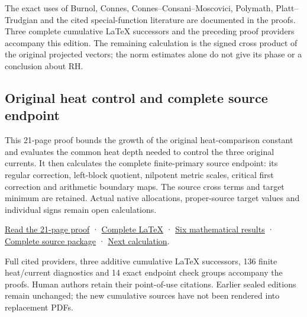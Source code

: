 \documentclass[
]{article}
\begin{document}
The exact uses of Burnol, Connes, Connes--Consani--Moscovici, Polymath,
Platt--Trudgian and the cited special-function literature are documented
in the proofs. Three complete cumulative LaTeX successors and the
preceding proof providers accompany this edition. The remaining
calculation is the signed cross product of the original projected
vectors; the norm estimates alone do not give its phase or a conclusion
about RH.

\subsection{Original heat control and complete source
endpoint}\label{original-heat-control-and-complete-source-endpoint}

This 21-page proof bounds the growth of the original heat-comparison
constant and evaluates the common heat depth needed to control the three
original currents. It then calculates the complete finite-primary source
endpoint: its regular correction, left-block quotient, nilpotent metric
scales, critical first correction and arithmetic boundary maps. The
source cross terms and target minimum are retained. Actual native
allocations, proper-source target values and individual signs remain
open calculations.

\href{https://github.com/KokunoYumeto/zeta-function-research-reader/blob/main/workbenches/splitzero-tandem/continuations/20260919-original-heat-source-endpoint/ORIGINAL_HEAT_AND_SOURCE_ENDPOINT.pdf}{Read
the 21-page proof} ·
\href{https://github.com/KokunoYumeto/zeta-function-research-reader/blob/main/workbenches/splitzero-tandem/continuations/20260919-original-heat-source-endpoint/ORIGINAL_HEAT_AND_SOURCE_ENDPOINT.tex}{Complete
LaTeX} ·
\href{https://github.com/KokunoYumeto/zeta-function-research-reader/blob/main/workbenches/splitzero-tandem/continuations/20260919-original-heat-source-endpoint/NEW_RESULTS_2026-09-19.md}{Six
mathematical results} ·
\href{https://github.com/KokunoYumeto/zeta-function-research-reader/blob/main/workbenches/splitzero-tandem/continuations/20260919-original-heat-source-endpoint/README.md}{Complete
source package} ·
\href{https://github.com/KokunoYumeto/zeta-function-research-reader/blob/main/workbenches/splitzero-tandem/continuations/20260919-original-heat-source-endpoint/CONTINUATION.md}{Next
calculation}.

Full cited providers, three additive cumulative LaTeX successors, 136
finite heat/current diagnostics and 14 exact endpoint check groups
accompany the proofs. Human authors retain their point-of-use citations.
Earlier sealed editions remain unchanged; the new cumulative sources
have not been rendered into replacement PDFs.
\end{document}
